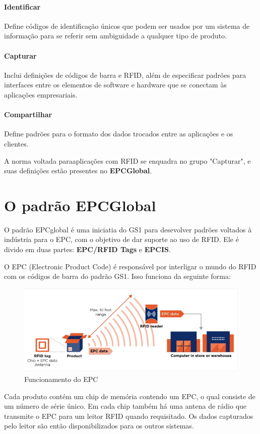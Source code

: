 \documentclass[a4paper,12pt,titlepage]{article}
\begin{document}
	\paragraph{Identificar} Define códigos de identificação únicos que podem ser usados por um sistema de informação para se referir sem ambiguidade a qualquer tipo de produto.
	\paragraph{Capturar} Inclui definições de códigos de barra e RFID, além de especificar padrões para interfaces entre os elementos de software e hardware que se conectam às aplicações empresariais.
	\paragraph{Compartilhar} Define padrões para o formato dos dados trocados entre as aplicações e os clientes.     

	A norma voltada paraaplicações com RFID se enquadra no grupo "Capturar", e suas definições estão presentes no \textbf{EPCGlobal}.


\section{O padrão EPCGlobal}
	O padrão EPCglobal é uma iniciatia do GS1 para desevolver padrões voltados à indústria para o EPC, com o objetivo de dar suporte ao uso de RFID. Ele é divido em duas partes: \textbf{EPC/RFID Tags} e \textbf{EPCIS}. 
	
	O EPC (Electronic Product Code) é responsável por interligar o mundo do RFID com os códigos de barra do padrão GS1. Isso funciona da seguinte forma:
		\begin{figure}[h!]
			\centering
			\includegraphics[width=0.5\linewidth]{epcrfid}
			\caption{Funcionamento do EPC}
			\label{fig:epcrfid}
		\end{figure}
	
	Cada produto contém um chip de memória contendo um EPC, o qual consiste de um número de série único. Em cada chip também há uma antena de rádio que transmite o EPC para um leitor RFID quando requisitado. Os dados capturados pelo leitor são então disponibilizados para os outros sistemas.
	
\end{document}
